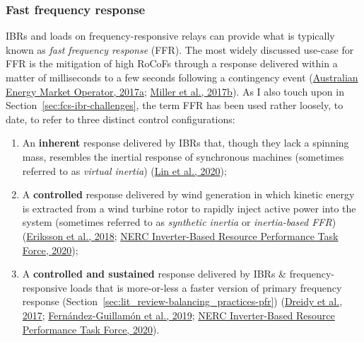 \documentclass[12pt,a4paper,]{report}
\providecommand{\tightlist}{%
  \setlength{\itemsep}{0pt}\setlength{\parskip}{0pt}}
\begin{document}
\hypertarget{fast-frequency-response}{%
\subsubsection{Fast frequency response}\label{fast-frequency-response}}

IBRs and loads on frequency-responsive relays can provide what is
typically known as \emph{fast frequency response} (FFR). The most widely
discussed use-case for FFR is the mitigation of high RoCoFs through a
response delivered within a matter of milliseconds to a few seconds
following a contingency event
(\protect\hyperlink{ref-australianenergymarketoperatorFastFrequencyResponse2017}{Australian
Energy Market Operator, 2017a};
\protect\hyperlink{ref-millerTechnologyCapabilitiesFast2017}{Miller et
al., 2017b}). As I also touch upon in
Section~\ref{sec:fcs-ibr-challenges}, the term FFR has been used rather
loosely, to date, to refer to three distinct control configurations:

\begin{enumerate}
\def\labelenumi{\arabic{enumi}.}
\tightlist
\item
  An \textbf{inherent} response delivered by IBRs that, though they lack
  a spinning mass, resembles the inertial response of synchronous
  machines (sometimes referred to as \emph{virtual inertia})
  (\protect\hyperlink{ref-linResearchRoadmapGridForming2020}{Lin et al.,
  2020});
\item
  A \textbf{controlled} response delivered by wind generation in which
  kinetic energy is extracted from a wind turbine rotor to rapidly
  inject active power into the system (sometimes referred to as
  \emph{synthetic inertia} or \emph{inertia-based FFR})
  (\protect\hyperlink{ref-erikssonSyntheticInertiaFast2018}{Eriksson et
  al., 2018};
  \protect\hyperlink{ref-nercinverter-basedresourceperformancetaskforceFastFrequencyResponse2020}{NERC
  Inverter-Based Resource Performance Task Force, 2020});
\item
  A \textbf{controlled and sustained} response delivered by IBRs \&
  frequency-responsive loads that is more-or-less a faster version of
  primary frequency response
  (Section~\ref{sec:lit_review-balancing_practices-pfr})
  (\protect\hyperlink{ref-dreidyInertiaResponseFrequency2017}{Dreidy et
  al., 2017};
  \protect\hyperlink{ref-fernandez-guillamonPowerSystemsHigh2019}{Fernández-Guillamón
  et al., 2019};
  \protect\hyperlink{ref-nercinverter-basedresourceperformancetaskforceFastFrequencyResponse2020}{NERC
  Inverter-Based Resource Performance Task Force, 2020}).
\end{enumerate}
\end{document}

